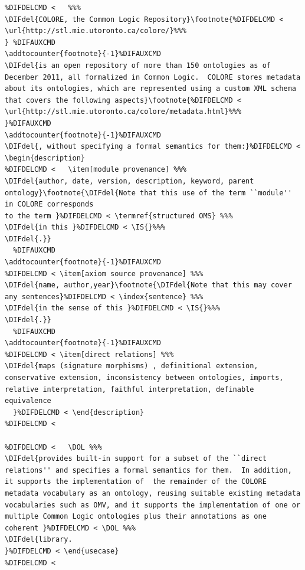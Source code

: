 \documentclass[10pt,fleqn,final]{scrreprt}
\newcommand*{\termref}[1]{\index{#1}#1\xspace}
\newcommand*{\IS}{OMG Specification\xspace}
\newcommand*{\DOL}{\ensuremath{\mathsf{DOL}}\xspace}
\providecommand{\DIFdel}[1]{{\protect\color{red}\sout{#1}}}                      %
\begin{document}
\begin{lstlisting}[basicstyle=\ttfamily,language=dolText,alsolanguage=CASL,escapechar=@,mathescape]
%DIFDELCMD < \begin{usecase}{Metadata in COLORE (Common Logic Repository)}{exists (but not yet \DOL-based)}{Annotation, Metadata vocabularies}
%DIFDELCMD <   %%%
\DIFdel{COLORE, the Common Logic Repository}\footnote{%DIFDELCMD < \url{http://stl.mie.utoronto.ca/colore/}%%%
} %DIFAUXCMD
\addtocounter{footnote}{-1}%DIFAUXCMD
\DIFdel{is an open repository of more than 150 ontologies as of December 2011, all formalized in Common Logic.  COLORE stores metadata about its ontologies, which are represented using a custom XML schema that covers the following aspects}\footnote{%DIFDELCMD < \url{http://stl.mie.utoronto.ca/colore/metadata.html}%%%
}%DIFAUXCMD
\addtocounter{footnote}{-1}%DIFAUXCMD
\DIFdel{, without specifying a formal semantics for them:}%DIFDELCMD < \begin{description}
%DIFDELCMD <   \item[module provenance] %%%
\DIFdel{author, date, version, description, keyword, parent ontology}\footnote{\DIFdel{Note that this use of the term ``module'' in COLORE corresponds
to the term }%DIFDELCMD < \termref{structured OMS} %%%
\DIFdel{in this }%DIFDELCMD < \IS{}%%%
\DIFdel{.}}
  %DIFAUXCMD
\addtocounter{footnote}{-1}%DIFAUXCMD
%DIFDELCMD < \item[axiom source provenance] %%%
\DIFdel{name, author,year}\footnote{\DIFdel{Note that this may cover any sentences}%DIFDELCMD < \index{sentence} %%%
\DIFdel{in the sense of this }%DIFDELCMD < \IS{}%%%
\DIFdel{.}}
  %DIFAUXCMD
\addtocounter{footnote}{-1}%DIFAUXCMD
%DIFDELCMD < \item[direct relations] %%%
\DIFdel{maps (signature morphisms) , definitional extension, conservative extension, inconsistency between ontologies, imports, relative interpretation, faithful interpretation, definable equivalence
  }%DIFDELCMD < \end{description}
%DIFDELCMD < 

%DIFDELCMD <   \DOL %%%
\DIFdel{provides built-in support for a subset of the ``direct relations'' and specifies a formal semantics for them.  In addition, it supports the implementation of  the remainder of the COLORE metadata vocabulary as an ontology, reusing suitable existing metadata vocabularies such as OMV, and it supports the implementation of one or multiple Common Logic ontologies plus their annotations as one coherent }%DIFDELCMD < \DOL %%%
\DIFdel{library.
}%DIFDELCMD < \end{usecase}
%DIFDELCMD < 


\end{lstlisting}
\end{document}
